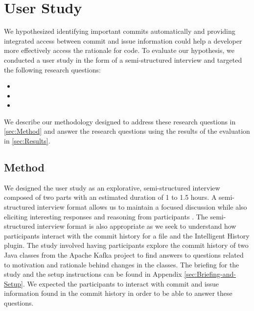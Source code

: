 \chapter{User Study}
\label{ch:Evaluation}

We hypothesized identifying important commits automatically and providing integrated access between commit and issue information could help a developer more effectively access the rationale for code.
To evaluate our hypothesis, we conducted a user study in the form of a semi-structured interview and targeted the following research questions:

\begin{itemize}[leftmargin=*]
    \item[] 
    \item[] 
    \item[] 
\end{itemize}

We describe our methodology designed to address these research questions in \autoref{sec:Method} and answer the research questions using the results of the evaluation in \autoref{sec:Results}.

\section{Method}
\label{sec:Method}

We designed the user study as an explorative, semi-structured interview composed of two parts with an estimated duration of 1 to 1.5 hours.
A semi-structured interview format allows us to maintain a focused discussion while also eliciting interesting responses and reasoning from participants \cite{shull_guide_2007}.
The semi-structured interview format is also appropriate as we seek to understand how participants interact with the commit history for a file and the Intelligent History plugin.
The study involved having participants explore the commit history of two Java classes from the Apache Kafka project to find answers to questions related to motivation and rationale behind changes in the classes.
The briefing for the study and the setup instructions can be found in Appendix \ref{sec:Briefing-and-Setup}.
We expected the participants to interact with commit and issue information found in the commit history in order to be able to answer these questions.

